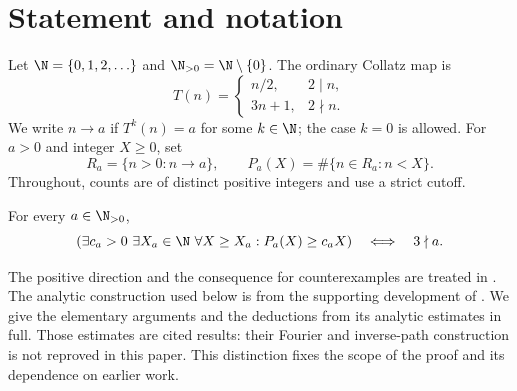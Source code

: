 \begin{abstract}
We give a detailed exposition of the positive lower density of the
predecessors of a fixed Collatz target. A positive target has a predecessor
set of positive lower natural density if and only if it is not divisible
by three. The proof uses inverse arithmetic, nonperiodic orbit points,
and the analytic inverse-path estimates of Mazur. We state the analytic
inputs separately and derive the counting conclusion step by step,
including the multiplicity bound and the passage from residue averages
to counts of distinct integers. We also prove the resulting criterion
for universal convergence. The positive-density result and its
counterexample consequence occur in Mazur's companion paper; they are
not asserted here as new discoveries. A verification appendix records
the corresponding Lean development.
\end{abstract}
\tableofcontents

\section{Statement and notation}
Let $\N=\{0,1,2,\ldots\}$ and $\N_{>0}=\N\setminus\{0\}$. The ordinary
Collatz map is
\begin{equation}\label{eq:T}
 T(n)=\begin{cases}n/2,&2\mid n,\\3n+1,&2\nmid n.\end{cases}
\end{equation}
We write $n\longrightarrow a$ if $T^k(n)=a$ for some $k\in\N$;
the case $k=0$ is allowed. For $a>0$ and integer $X\ge0$, set
\begin{equation}\label{eq:count}
 R_a=\{n>0:n\longrightarrow a\},\qquad P_a(X)=\#\{n\in R_a:n<X\}.
\end{equation}
Throughout, counts are of distinct positive integers and use a strict cutoff.

\begin{theorem}\label{thm:main}
For every $a\in\N_{>0}$,
\begin{equation}\label{eq:main}
 \left(\exists c_a>0\ \exists X_a\in\N\ \forall X\ge X_a:
 P_a(X)\ge c_aX\right)\quad\Longleftrightarrow\quad 3\nmid a.
\end{equation}
\end{theorem}
The positive direction and the consequence for counterexamples are treated
in \cite{mazur-predecessors}. The analytic construction used below is from
the supporting development of \cite{mazur-density}. We give the elementary
arguments and the deductions from its analytic estimates in full. Those
estimates are cited results: their Fourier and inverse-path construction
is not reproved in this paper. This distinction fixes the scope of the
proof and its dependence on earlier work.

